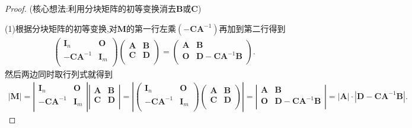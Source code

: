 \documentclass[../../main.tex]{subfiles}%
\begin{document}
\begin{proof}
(核心想法:利用分块矩阵的初等变换消去$\boldsymbol{B}$或$\boldsymbol{C}$)

(1)根据分块矩阵的初等变换,对$\boldsymbol{M}$的第一行左乘$(-\boldsymbol{CA}^{-1})$再加到第二行得到
\begin{align*}
\left( \begin{matrix}
\boldsymbol{I}_n&		\boldsymbol{O}\\
-\boldsymbol{CA}^{-1}&		\boldsymbol{I}_m\\
\end{matrix} \right) \left( \begin{matrix}
\boldsymbol{A}&		\boldsymbol{B}\\
\boldsymbol{C}&		\boldsymbol{D}\\
\end{matrix} \right) =\left( \begin{matrix}
\boldsymbol{A}&		\boldsymbol{B}\\
\boldsymbol{O}&		\boldsymbol{D}-\boldsymbol{CA}^{-1}\boldsymbol{B}\\
\end{matrix} \right) .
\end{align*}
然后两边同时取行列式就得到
\begin{align*}
\left| \boldsymbol{M} \right|=\left| \begin{matrix}
\boldsymbol{I}_n&		\boldsymbol{O}\\
-\boldsymbol{CA}^{-1}&		\boldsymbol{I}_m\\
\end{matrix} \right|\left| \begin{matrix}
\boldsymbol{A}&		\boldsymbol{B}\\
\boldsymbol{C}&		\boldsymbol{D}\\
\end{matrix} \right|=\left| \left( \begin{matrix}
\boldsymbol{I}_n&		\boldsymbol{O}\\
-\boldsymbol{CA}^{-1}&		\boldsymbol{I}_m\\
\end{matrix} \right) \left( \begin{matrix}
\boldsymbol{A}&		\boldsymbol{B}\\
\boldsymbol{C}&		\boldsymbol{D}\\
\end{matrix} \right) \right|=\left| \begin{matrix}
\boldsymbol{A}&		\boldsymbol{B}\\
\boldsymbol{O}&		\boldsymbol{D}-\boldsymbol{CA}^{-1}\boldsymbol{B}\\
\end{matrix} \right|=|\boldsymbol{A}|\cdot |\boldsymbol{D}-\boldsymbol{CA}^{-1}\boldsymbol{B}|.
\end{align*}


\end{proof}
\end{document}
